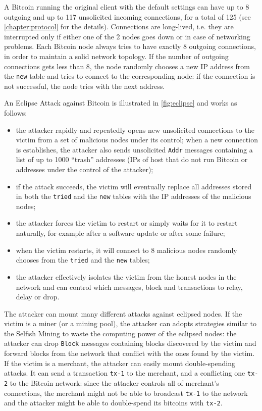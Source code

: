A Bitcoin running the original client \cite{bitcoin_github} with the default settings can have up to \num{8} outgoing and up to \num{117} unsolicited incoming connections, for a total of \num{125} \cite{deanonymisation_2014, eclipse_attack_2015} (see \cref{chapter:protocol} for the details).
Connections are long-lived, i.e. they are interrupted only if either one of the \num{2} nodes goes down or in case of networking problems.
Each Bitcoin node always tries to have exactly \num{8} outgoing connections, in order to maintain a solid network topology.
If the number of outgoing connections gets less than \num{8}, the node randomly chooses a new IP address from the \texttt{new} table and tries to connect to the corresponding node:
if the connection is not successful, the node tries with the next address.

\medskip
An Eclipse Attack against Bitcoin \cite{eclipse_attack_2015} is illustrated in \cref{fig:eclipse} and works as follows:
\begin{itemize}
	\item the attacker rapidly and repeatedly opens new unsolicited connections to the victim from a set of malicious nodes under its control; when a new connection is establishes, the attacker also sends unsolicited \texttt{Addr} messages containing a list of up to \num{1000} ``trash'' addresses (IPs of host that do not run Bitcoin or addresses under the control of the attacker);
	\item if the attack succeeds, the victim will eventually replace all addresses stored in both the \texttt{tried} and the \texttt{new} tables with the IP addresses of the malicious nodes;
	\item the attacker forces the victim to restart \cite{cve_bloom_filter_2013, bitcoin_common_vulnerabilities} or simply waits for it to restart naturally, for example after a software update or after some failure;
	\item when the victim restarts, it will connect to \num{8} malicious nodes randomly chooses from the \texttt{tried} and the \texttt{new} tables;
	\item the attacker effectively isolates the victim from the honest nodes in the network and can control which messages, block and transactions to relay, delay or drop.
\end{itemize}

The attacker can mount many different attacks against eclipsed nodes.
If the victim is a miner (or a mining pool), the attacker can adopts strategies similar to the Selfish Mining to waste the computing power of the eclipsed nodes:
the attacker can drop \texttt{Block} messages containing blocks discovered by the victim and forward blocks from the network that conflict with the ones found by the victim.
If the victim is a merchant, the attacker can easily mount double-spending attacks.
It can send a transaction \texttt{tx-1} to the merchant, and a conflicting one \texttt{tx-2} to the Bitcoin network:
since the attacker controls all of merchant's connections, the merchant might not be able to broadcast \texttt{tx-1} to the network and the attacker might be able to double-spend its bitcoins with \texttt{tx-2}.


